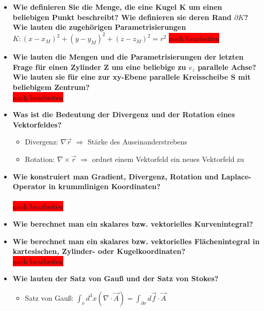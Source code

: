 \documentclass[german]{latex4ei/latex4ei_sheet}
\begin{document}
\begin{sectionbox}
\begin{itemize}
		\item \textbf{Wie definieren Sie die Menge, die eine Kugel K um einen\\
		 beliebigen Punkt beschreibt? Wie definieren sie deren Rand $\partial K$? Wie lauten die zugehörigen Parametrisierungen}\\
		$K: (x−x_M)^2+(y−y_M)^2+(z−z_M)^2=r^2$
		\colorbox{red}{noch bearbeiten}
		\item \textbf{Wie lauten die Mengen und die Parametrisierungen der letzten Frage für einen Zylinder Z um eine beliebige zu $e_z$ parallele Achse? Wie lauten sie für eine zur xy-Ebene parallele Kreisscheibe S mit beliebigem Zentrum?}\\
		\colorbox{red}{noch bearbeiten}
		\item \textbf{Was ist die Bedeutung der Divergenz und der Rotation eines Vektorfeldes?}
			\begin{itemize}
				\item Divergenz: $\nabla\vec{r}$ $\Rightarrow$ Stärke des Auseinanderstrebens
				\item Rotation: $\nabla\times\vec{r}$ $\Rightarrow$ ordnet einem Vektorfeld ein neues Vektorfeld zu
			\end{itemize}
		\item \textbf{Wie konstruiert man Gradient, Divergenz, Rotation und Laplace-Operator in
krummlinigen Koordinaten?}\\
		\\\colorbox{red}{noch bearbeiten}
		\item \textbf{Wie berechnet man ein skalares bzw. vektorielles Kurvenintegral?}
		\begin{itemize}
			\item skalares Kurvenintegral: $\int_\gamma fds:=\int_a^bf(\gamma(t))\cdot|\dot{\gamma}(t)|dt$
			\item vektorielles Kurvenintegral: $\int_\gamma \vec{f}d\vec{s}:=\int_a^b\vec{f}(\vec{\gamma}}(t))\cdot|\dot{\vec{\gamma}}(t)|dt$
		\end{itemize}
		\item \textbf{Wie berechnet man ein skalares bzw. vektorielles Flächenintegral in kartesischen, Zylinder- oder Kugelkoordinaten?}
		\\\colorbox{red}{noch bearbeiten}
		\item \textbf{Wie lauten der Satz von Gauß und der Satz von Stokes?}
			\begin{itemize}
				\item Satz von Gauß: $\int_\nu d^3x(\nabla\cdot\vec{A})=\int_{\partial\nu}d\vec{f}\cdot\vec{A}$

\end{itemize}
\end{itemize}
\end{sectionbox}
\end{document}
